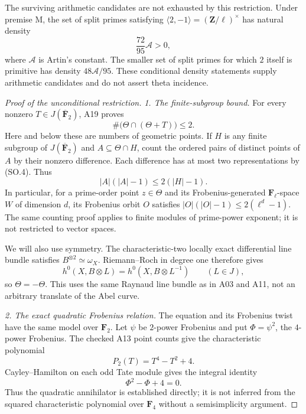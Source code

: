 \documentclass[11pt,a4paper]{article}
\begin{document}
The surviving arithmetic candidates are not exhausted by this
restriction.  Under premise M, the set of split primes satisfying
$\langle2,-1\rangle=(\mathbf Z/\ell)^\times$ has natural density
\[
                         \frac{72}{95}\mathcal A>0,        \tag{SO.3}
\]
where $\mathcal A$ is Artin's constant.  The smaller set of split
primes for which $2$ itself is primitive has density
$48\mathcal A/95$.  These conditional density statements supply
arithmetic candidates and do not assert theta incidence.

\begin{proof}[Proof of the unconditional restriction]
\emph{1. The finite-subgroup bound.}
For every nonzero $T\in J(\overline{\mathbf F}_2)$, A19 proves
\[
                   \#\bigl(\Theta\cap(\Theta+T)\bigr)\le2.
                                                        \tag{SO.4}
\]
Here and below these are numbers of geometric points.  If $H$ is
any finite subgroup of $J(\overline{\mathbf F}_2)$ and
$A\subseteq\Theta\cap H$, count the ordered pairs of distinct
points of $A$ by their nonzero difference.  Each difference has
at most two representations by (SO.4).  Thus
\[
                         |A|(|A|-1)\le2(|H|-1).           \tag{SO.5}
\]
In particular, for a prime-order point $z\in\Theta$ and its
Frobenius-generated $\mathbf F_\ell$-space $W$ of dimension $d$,
its Frobenius orbit $O$ satisfies
$|O|(|O|-1)\le2(\ell^d-1)$.  The same counting proof applies
to finite modules of prime-power exponent; it is not restricted
to vector spaces.

We will also use symmetry.  The characteristic-two locally exact
differential line bundle satisfies $B^{\otimes2}\simeq\omega_X$.
Riemann--Roch in degree one therefore gives
\[
 h^0(X,B\otimes L)=h^0(X,B\otimes L^{-1})
                        \qquad(L\in J),
\]
so $\Theta=-\Theta$.  This uses the same Raynaud line bundle as
in A03 and A11, not an arbitrary translate of the Abel curve.

\emph{2. The exact quadratic Frobenius relation.}
The equation and its Frobenius twist have the same model over
$\mathbf F_2$.  Let $\psi$ be $2$-power Frobenius and put
$\Phi=\psi^2$, the $4$-power Frobenius.  The checked A13 point
counts give the characteristic polynomial
\[
                    P_2(T)=T^4-T^2+4.
\]
Cayley--Hamilton on each odd Tate module gives the integral
identity
\[
                      \Phi^2-\Phi+4=0.                    \tag{SO.6}
\]
Thus the quadratic annihilator is established directly; it is
not inferred from the squared characteristic polynomial over
$\mathbf F_4$ without a semisimplicity argument.


\end{proof}
\end{document}

